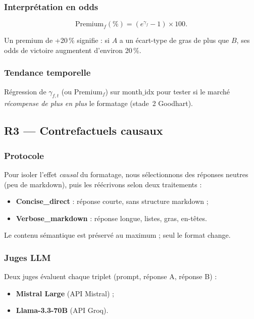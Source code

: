 \documentclass[11pt,a4paper]{article}
\begin{document}
\subsubsection{Interprétation en odds}

\begin{equation}
  \text{Premium}_f(\%) = \left(e^{\gamma_f} - 1\right) \times 100.
  \label{eq:premium}
\end{equation}

Un premium de +20\,\% signifie : si $A$ a un écart-type de gras de plus que $B$,
ses odds de victoire augmentent d'environ 20\,\%.

\subsubsection{Tendance temporelle}

Régression de $\gamma_{f,t}$ (ou $\text{Premium}_f$) sur $\text{month\_idx}$ pour
tester si le marché \emph{récompense de plus en plus} le formatage (stade~2 Goodhart).

\subsection{R3 --- Contrefactuels causaux}

\subsubsection{Protocole}

Pour isoler l'effet \emph{causal} du formatage, nous sélectionnons des réponses
neutres (peu de markdown), puis les réécrivons selon deux traitements :
\begin{itemize}[noitemsep]
  \item \textbf{Concise\_direct} : réponse courte, sans structure markdown ;
  \item \textbf{Verbose\_markdown} : réponse longue, listes, gras, en-têtes.
\end{itemize}
Le contenu sémantique est préservé au maximum ; seul le format change.

\subsubsection{Juges LLM}

Deux juges évaluent chaque triplet (prompt, réponse A, réponse B) :
\begin{itemize}[noitemsep]
  \item \textbf{Mistral Large} (API Mistral) ;
  \item \textbf{Llama-3.3-70B} (API Groq).
\end{itemize}
\end{document}
